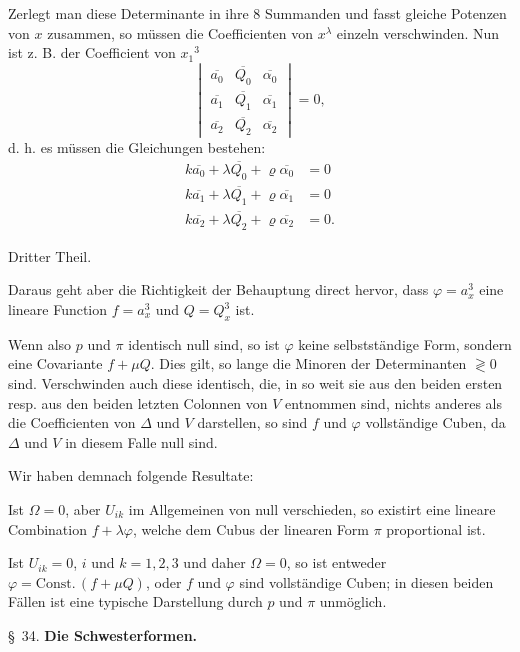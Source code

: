 Zerlegt man diese Determinante in ihre 8 Summanden und fasst gleiche Potenzen von $x$ zusammen, so müssen die Coefficienten von $x^\lambda$ einzeln verschwinden. Nun ist z. B. der Coefficient von $x_1{}^3$
\[
\begin{vmatrix}
\overline{a_0} & \overline{Q_0} & \overline{\alpha_0} \\
\overline{a_1} & \overline{Q_1} & \overline{\alpha_1} \\
\overline{a_2} & \overline{Q_2} & \overline{\alpha_2}
\end{vmatrix} = 0,
\]
d. h. es müssen die Gleichungen bestehen:
\[
\begin{aligned}
k\overline{a_0} + \lambda \overline{Q_0} + \varrho\overline{\alpha_0} &= 0 \\
k\overline{a_1} + \lambda \overline{Q_1} + \varrho\overline{\alpha_1} &= 0 \\
k\overline{a_2} + \lambda \overline{Q_2} + \varrho\overline{\alpha_2} &= 0.
\end{aligned}
\]


Dritter Theil.

Daraus geht aber die Richtigkeit der Behauptung direct hervor, dass $\varphi = a_x^3$ eine lineare Function $f = a_x^3$ und $Q = Q_x^3$ ist.

Wenn also $p$ und $\pi$ identisch null sind, so ist $\varphi$ keine selbstständige Form, sondern eine Covariante $f + \mu Q$. Dies gilt, so lange die Minoren der Determinanten $\gtrless 0$ sind. Verschwinden auch diese identisch, die, in so weit sie aus den beiden ersten resp. aus den beiden letzten Colonnen von $V$ entnommen sind, nichts anderes als die Coefficienten von $\Delta$ und $V$ darstellen, so sind $f$ und $\varphi$ vollständige Cuben, da $\Delta$ und $V$ in diesem Falle null sind.

Wir haben demnach folgende Resultate:

\glqq Ist $\Omega = 0$, aber $U_{ik}$ im Allgemeinen von null verschieden, so existirt eine lineare Combination $f + \lambda\varphi$, welche dem Cubus der linearen Form $\pi$ proportional ist.\grqq{}

\glqq Ist $U_{ik} = 0$, $i$ und $k = 1, 2, 3$ und daher $\Omega = 0$, so ist entweder $\varphi = \mathrm{Const.}\,(f + \mu Q)$, oder $f$ und $\varphi$ sind vollständige Cuben; in diesen beiden Fällen ist eine typische Darstellung durch $p$ und $\pi$ unmöglich.\grqq{}

\bigskip
\centerline{\S\ 34. \textbf{Die Schwesterformen.}}
\bigskip

